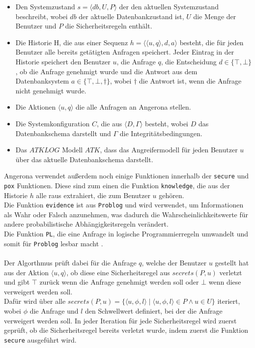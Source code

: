 \documentclass[german,version-2020-11]{uzl-thesis}
\begin{document}
\begin{itemize}
	\item Den Systemzustand $s=\langle db,U,P\rangle $ der den aktuellen Systemzustand beschreibt, wobei $db$ der aktuelle Datenbankzustand ist, $U$ die Menge der Benutzer und $P$ die Sicherheitsregeln enthält.
	\item Die Historie H, die aus einer Sequenz $h=\langle \langle u,q \rangle ,d,a \rangle$ besteht, die für jeden Benutzer alle bereits getätigten Anfragen speichert. Jeder Eintrag in der Historie speichert den Benutzer $u$, die Anfrage $q$, die Entscheidung $d \in \{\top, \bot \}$, ob die Anfrage genehmigt wurde und die Antwort aus dem Datenbanksystem $a \in \{\top, \bot , \dag \} $, wobei $\dag$ die Antwort ist, wenn die Anfrage nicht genehmigt wurde.
	\item Die Aktionen $\langle u,q \rangle$ die alle Anfragen an Angerona stellen.
	\item Die Systemkonfiguration $C$, die aus $\langle D,\Gamma \rangle$ besteht, wobei $D$  das Datenbankschema darstellt und $\Gamma$ die Integritätsbedingungen. 
	\item  Das $ATKLOG$ Modell $ATK$, dass das Angreifermodell für jeden Benutzer $u$ über das aktuelle Datenbankschema darstellt.
\end{itemize}
Angerona verwendet außerdem noch einige Funktionen innerhalb der \texttt{secure} und \texttt{pox} Funktionen. Diese sind zum einen die Funktion \texttt{knowledge}, die aus der Historie $h$ alle raus extrahiert, die zum Benutzer $u$ gehören.\\
Die Funktion \texttt{evidence} ist aus \texttt{Problog} und wird verwendet, um Informationen als Wahr oder Falsch anzunehmen, was dadurch die Wahrscheinlichkeitswerte für andere probabilistische Abhängigkeitsregeln verändert.\\ 
Die Funktion \texttt{PL}, die  eine Anfrage in logische Programmierregeln umwandelt und somit für \texttt{Problog} lesbar macht \cite{guarnieri2017securing}.  \\ \\
Der Algorthmus prüft dabei für die Anfrage $q$, welche der Benutzer $u$ gestellt hat aus der Aktion $\langle u,q \rangle$, ob diese eine Sicherheitsregel aus $secrets(P,u)$ verletzt und gibt $\top$ zurück wenn die Anfrage genehmigt werden soll oder $\bot$ wenn diese verweigert werden soll. \\ 
Dafür wird über alle  $secrets(P,u) = \{ \langle u,\phi,l \rangle \mid \langle u,\phi,l \rangle \in P \land u \in U\}$ iteriert, wobei $\phi$ die Anfrage und $l$ den Schwellwert definiert, bei der die Anfrage verweigert werden soll. In jeder Iteration für jede Sicherheitsregel wird zuerst geprüft, ob die Sicherheitsregel bereits verletzt wurde, indem zuerst die Funktion \texttt{secure} ausgeführt wird. \\ 
\end{document}
